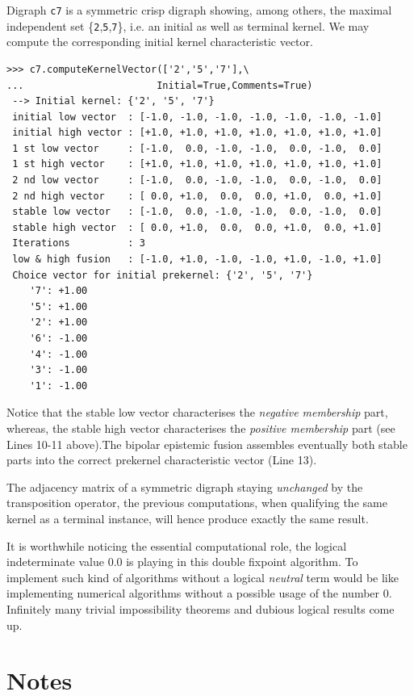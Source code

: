 Digraph \texttt{c7} is a symmetric crisp digraph showing, among others, the maximal independent set \{\texttt{2},\texttt{5},\texttt{7}\}, i.e. an initial as well as terminal kernel. We may compute the corresponding initial kernel characteristic vector.
\begin{lstlisting}[basicstyle=\ttfamily\scriptsize]
>>> c7.computeKernelVector(['2','5','7'],\
...                       Initial=True,Comments=True)
 --> Initial kernel: {'2', '5', '7'}
 initial low vector  : [-1.0, -1.0, -1.0, -1.0, -1.0, -1.0, -1.0]
 initial high vector : [+1.0, +1.0, +1.0, +1.0, +1.0, +1.0, +1.0]
 1 st low vector     : [-1.0,  0.0, -1.0, -1.0,  0.0, -1.0,  0.0]
 1 st high vector    : [+1.0, +1.0, +1.0, +1.0, +1.0, +1.0, +1.0]
 2 nd low vector     : [-1.0,  0.0, -1.0, -1.0,  0.0, -1.0,  0.0]
 2 nd high vector    : [ 0.0, +1.0,  0.0,  0.0, +1.0,  0.0, +1.0]
 stable low vector   : [-1.0,  0.0, -1.0, -1.0,  0.0, -1.0,  0.0]
 stable high vector  : [ 0.0, +1.0,  0.0,  0.0, +1.0,  0.0, +1.0]
 Iterations          : 3
 low & high fusion   : [-1.0, +1.0, -1.0, -1.0, +1.0, -1.0, +1.0]
 Choice vector for initial prekernel: {'2', '5', '7'}
    '7': +1.00
    '5': +1.00
    '2': +1.00
    '6': -1.00
    '4': -1.00
    '3': -1.00
    '1': -1.00
\end{lstlisting}

Notice that the stable low vector characterises the \emph{negative membership} part, whereas, the stable high vector characterises the \emph{positive membership} part (see Lines 10-11 above).The bipolar epistemic fusion assembles eventually both stable parts into the correct prekernel characteristic vector (Line 13). 

The adjacency matrix of a symmetric digraph staying \emph{unchanged} by the transposition operator, the previous computations, when qualifying the same kernel as a terminal instance, will hence produce exactly the same result.

It is worthwhile noticing the essential computational role, the logical indeterminate value $0.0$ is playing in this double fixpoint algorithm. To implement such kind of algorithms without a logical \emph{neutral} term would be like implementing numerical algorithms without a possible usage of the number $0$. Infinitely many trivial impossibility theorems and dubious logical results come up. 

{}
\section*{Notes}

